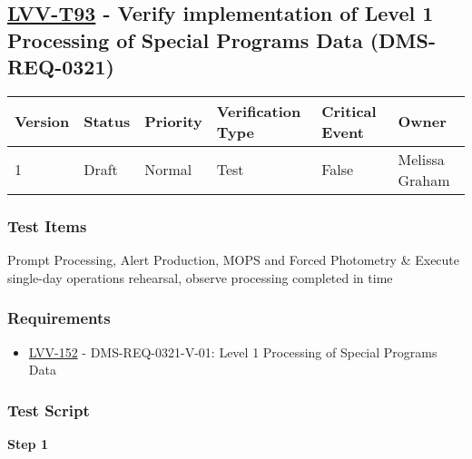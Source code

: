 \hypertarget{lvv-t93---verify-implementation-of-level-1-processing-of-special-programs-data-dms-req-0321}{%
\subsection{\texorpdfstring{\href{https://jira.lsstcorp.org/secure/Tests.jspa\#/testCase/LVV-T93}{LVV-T93}
- Verify implementation of Level 1 Processing of Special Programs Data
(DMS-REQ-0321)}{LVV-T93 - Verify implementation of Level 1 Processing of Special Programs Data (DMS-REQ-0321)}}\label{lvv-t93---verify-implementation-of-level-1-processing-of-special-programs-data-dms-req-0321}}

\begin{longtable}[]{@{}llllll@{}}
\toprule
Version & Status & Priority & Verification Type & Critical Event &
Owner\tabularnewline
\midrule
\endhead
1 & Draft & Normal & Test & False & Melissa Graham\tabularnewline
\bottomrule
\end{longtable}

\hypertarget{test-items-69}{%
\subsubsection{Test Items}\label{test-items-69}}

Prompt Processing, Alert Production, MOPS and Forced Photometry \&
Execute single-day operations rehearsal, observe processing completed in
time

\hypertarget{requirements-70}{%
\subsubsection{Requirements}\label{requirements-70}}

\begin{itemize}
\tightlist
\item
  \href{https://jira.lsstcorp.org/browse/LVV-152}{LVV-152} -
  DMS-REQ-0321-V-01: Level 1 Processing of Special Programs Data
\end{itemize}

\hypertarget{test-script-70}{%
\subsubsection{Test Script}\label{test-script-70}}

\textbf{Step 1}\\
~\\
~\\

